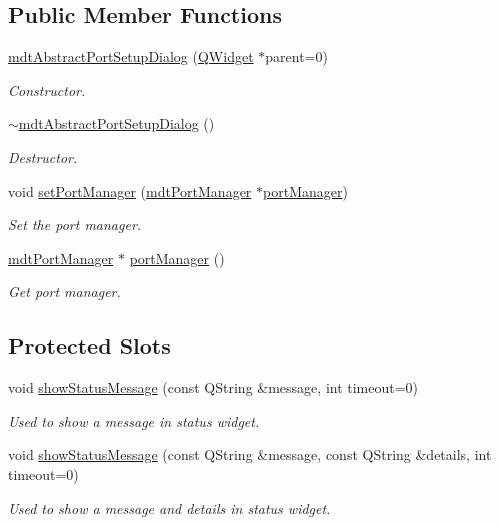 \subsection*{Public Member Functions}
\begin{DoxyCompactItemize}
\item 
\hyperlink{classmdt_abstract_port_setup_dialog_a3f62d7eb0c8bdc3bbc7874b975ee7fd2}{mdt\-Abstract\-Port\-Setup\-Dialog} (\hyperlink{class_q_widget}{Q\-Widget} $\ast$parent=0)
\begin{DoxyCompactList}\small\item\em Constructor. \end{DoxyCompactList}\item 
\hyperlink{classmdt_abstract_port_setup_dialog_ad4df603a6fa5277757cdceef2bf9e4df}{$\sim$mdt\-Abstract\-Port\-Setup\-Dialog} ()
\begin{DoxyCompactList}\small\item\em Destructor. \end{DoxyCompactList}\item 
void \hyperlink{classmdt_abstract_port_setup_dialog_a016ab988e47c7702a9400985eb95fbc5}{set\-Port\-Manager} (\hyperlink{classmdt_port_manager}{mdt\-Port\-Manager} $\ast$\hyperlink{classmdt_abstract_port_setup_dialog_a4aeeb47c43174bfa005e51100b767c13}{port\-Manager})
\begin{DoxyCompactList}\small\item\em Set the port manager. \end{DoxyCompactList}\item 
\hyperlink{classmdt_port_manager}{mdt\-Port\-Manager} $\ast$ \hyperlink{classmdt_abstract_port_setup_dialog_a4aeeb47c43174bfa005e51100b767c13}{port\-Manager} ()
\begin{DoxyCompactList}\small\item\em Get port manager. \end{DoxyCompactList}\end{DoxyCompactItemize}
\subsection*{Protected Slots}
\begin{DoxyCompactItemize}
\item 
void \hyperlink{classmdt_abstract_port_setup_dialog_a93809d1ae18b5580eeebf15c561bc89f}{show\-Status\-Message} (const Q\-String \&message, int timeout=0)
\begin{DoxyCompactList}\small\item\em Used to show a message in status widget. \end{DoxyCompactList}\item 
void \hyperlink{classmdt_abstract_port_setup_dialog_aa7f429788e0a6ab9d635afa126480e2d}{show\-Status\-Message} (const Q\-String \&message, const Q\-String \&details, int timeout=0)
\begin{DoxyCompactList}\small\item\em Used to show a message and details in status widget. \end{DoxyCompactList}\end{DoxyCompactItemize}

